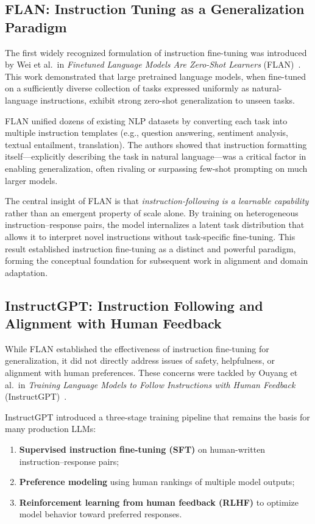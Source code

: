 \documentclass[sigconf]{acmart}
\begin{document}
\subsection{FLAN: Instruction Tuning as a Generalization Paradigm}

The first widely recognized formulation of instruction fine-tuning was introduced by Wei et al.\ in \emph{Finetuned Language Models Are Zero-Shot Learners} (FLAN)~\cite{wei2022flan}. This work demonstrated that large pretrained language models, when fine-tuned on a sufficiently diverse collection of tasks expressed uniformly as natural-language instructions, exhibit strong zero-shot generalization to unseen tasks.

FLAN unified dozens of existing NLP datasets by converting each task into multiple instruction templates (e.g., question answering, sentiment analysis, textual entailment, translation). The authors showed that instruction formatting itself---explicitly describing the task in natural language---was a critical factor in enabling generalization, often rivaling or surpassing few-shot prompting on much larger models.

The central insight of FLAN is that \emph{instruction-following is a learnable capability} rather than an emergent property of scale alone. By training on heterogeneous instruction--response pairs, the model internalizes a latent task distribution that allows it to interpret novel instructions without task-specific fine-tuning. This result established instruction fine-tuning as a distinct and powerful paradigm, forming the conceptual foundation for subsequent work in alignment and domain adaptation.

\subsection{InstructGPT: Instruction Following and Alignment with Human Feedback}

While FLAN established the effectiveness of instruction fine-tuning for generalization, it did not directly address issues of safety, helpfulness, or alignment with human preferences. These concerns were tackled by Ouyang et al.\ in \emph{Training Language Models to Follow Instructions with Human Feedback} (InstructGPT)~\cite{ouyang2022instructgpt}.

InstructGPT introduced a three-stage training pipeline that remains the basis for many production LLMs:
\begin{enumerate}
  \item \textbf{Supervised instruction fine-tuning (SFT)} on human-written instruction--response pairs;
  \item \textbf{Preference modeling} using human rankings of multiple model outputs;
  \item \textbf{Reinforcement learning from human feedback (RLHF)} to optimize model behavior toward preferred responses.
\end{enumerate}
\end{document}
